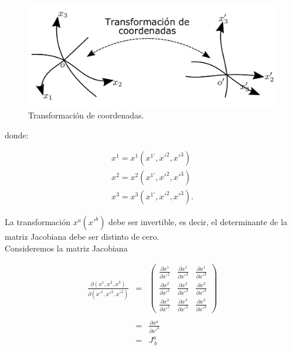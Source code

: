\documentclass[12pt]{report}
\begin{document}
\begin{figure}[h]
	\centering
	\includegraphics[width=12cm]{figura133.png}
	\caption{ Transformación de coordenadas.}
	\label{}
\end{figure}



donde:

\begin{eqnarray} \nonumber
x^1= x^1(x^{1'},x'^{2},x'^{3}) \\ \nonumber
x^2= x^2(x^{1'},x'^{2},x'^{3}) \\ \nonumber
x^3= x^3(x^{1'},x'^{2},x'^{3}).
\end{eqnarray}


La transformación $x^a(x'^{b})$ debe ser invertible, es decir, el determinante de la matriz Jacobiana debe ser distinto de cero. \\

Consideremos la matriz Jacobiana

\begin{eqnarray}
\frac{\partial \left(x^1, x^2, x^3 \right)}{ \partial \left( x'^{1}, x'^{2},x'^{3} \right)}
&=&
\left(
\begin{array}{ccc} \nonumber
\displaystyle\frac{\partial x^1}{\partial x'^1} & \displaystyle\frac{\partial x^1}{\partial x'^2} & \displaystyle\frac{\partial x^1}{\partial x'^3} \\ \nonumber
\displaystyle\frac{\partial x^2}{\partial x'^1} & \displaystyle\frac{\partial x^2}{\partial x'^2} & \displaystyle\frac{\partial x^2}{\partial x'^3} \\ \nonumber
\displaystyle\frac{\partial x^3}{\partial x'^1} & \displaystyle\frac{\partial x^3}{\partial x'^2} & \displaystyle\frac{\partial x^3}{\partial x'^3}
\end{array}
\right) \\ \nonumber
\\ \nonumber
 &=& \frac{\partial x^a}{\partial x'^b} \\ \label{2.86}
 &=&J^a_{ \ b}
\end{eqnarray}
\end{document}
